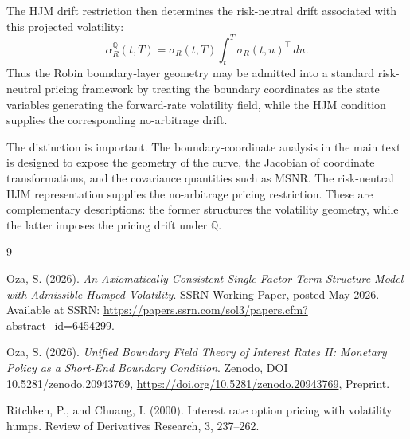 \documentclass[11pt]{article}
\numberwithin{equation}{section}
\begin{document}
\begin{appendices}
The HJM drift restriction then determines the risk-neutral drift associated
with this projected volatility:
\[
        \alpha_R^{\mathbb Q}(t,T)
        =
        \sigma_R(t,T)
        \int_t^T
        \sigma_R(t,u)^\top\,du .
\]
Thus the Robin boundary-layer geometry may be admitted into a standard
risk-neutral pricing framework by treating the boundary coordinates as the
state variables generating the forward-rate volatility field, while the HJM
condition supplies the corresponding no-arbitrage drift.

The distinction is important.  The boundary-coordinate analysis in the main
text is designed to expose the geometry of the curve, the Jacobian of
coordinate transformations, and the covariance quantities such as MSNR.  The
risk-neutral HJM representation supplies the no-arbitrage pricing
restriction.  These are complementary descriptions: the former structures
the volatility geometry, while the latter imposes the pricing drift under
\(\mathbb Q\).
\end{appendices}

\begin{thebibliography}{9}

Oza, S. (2026).
\emph{An Axiomatically Consistent Single-Factor Term Structure Model with Admissible Humped Volatility}.
SSRN Working Paper, posted May 2026.
Available at SSRN: \url{https://papers.ssrn.com/sol3/papers.cfm?abstract_id=6454299}.

Oza, S. (2026).
\emph{Unified Boundary Field Theory of Interest Rates II: Monetary Policy as a Short-End Boundary Condition}.
Zenodo, DOI {10.5281/zenodo.20943769},
\url{https://doi.org/10.5281/zenodo.20943769},
Preprint.

Ritchken, P., and Chuang, I. (2000).
Interest rate option pricing with volatility humps.
Review of Derivatives Research, 3, 237--262.

\end{thebibliography}
\end{document}
